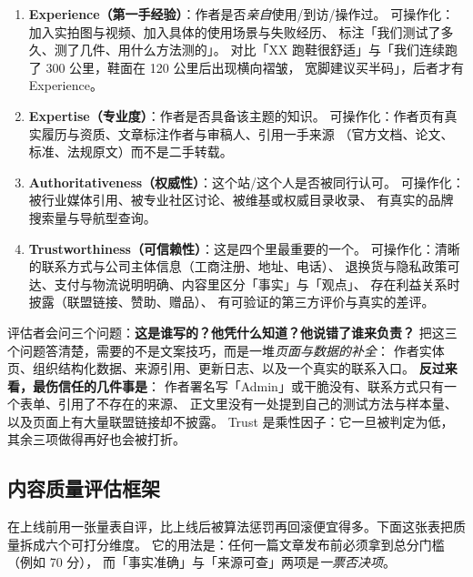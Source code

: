\begin{enumerate}
  \item \textbf{Experience（第一手经验）}：作者是否\emph{亲自}使用/到访/操作过。
        可操作化：加入实拍图与视频、加入具体的使用场景与失败经历、
        标注「我们测试了多久、测了几件、用什么方法测的」。
        对比「XX 跑鞋很舒适」与「我们连续跑了 300 公里，鞋面在 120 公里后出现横向褶皱，
        宽脚建议买半码」，后者才有 Experience。
  \item \textbf{Expertise（专业度）}：作者是否具备该主题的知识。
        可操作化：作者页有真实履历与资质、文章标注作者与审稿人、引用一手来源
        （官方文档、论文、标准、法规原文）而不是二手转载。
  \item \textbf{Authoritativeness（权威性）}：这个站/这个人是否被同行认可。
        可操作化：被行业媒体引用、被专业社区讨论、被维基或权威目录收录、
        有真实的品牌搜索量与导航型查询。
  \item \textbf{Trustworthiness（可信赖性）}：这是四个里最重要的一个。
        可操作化：清晰的联系方式与公司主体信息（工商注册、地址、电话）、
        退换货与隐私政策可达、支付与物流说明明确、内容里区分「事实」与「观点」、
        存在利益关系时披露（联盟链接、赞助、赠品）、
        有可验证的第三方评价与真实的差评。
\end{enumerate}

\begin{keypoint}
评估者会问三个问题：\textbf{这是谁写的？他凭什么知道？他说错了谁来负责？}
把这三个问题答清楚，需要的不是文案技巧，而是一堆\emph{页面与数据的补全}：
作者实体页、组织结构化数据、来源引用、更新日志、以及一个真实的联系入口。
\textbf{反过来看，最伤信任的几件事是}：
作者署名写「Admin」或干脆没有、联系方式只有一个表单、引用了不存在的来源、
正文里没有一处提到自己的测试方法与样本量、以及页面上有大量联盟链接却不披露。
Trust 是乘性因子：它一旦被判定为低，其余三项做得再好也会被打折。
\end{keypoint}

\subsection{内容质量评估框架}

在上线前用一张量表自评，比上线后被算法惩罚再回滚便宜得多。下面这张表把质量拆成六个可打分维度。
它的用法是：任何一篇文章发布前必须拿到总分门槛（例如 70 分），
而「事实准确」与「来源可查」两项是\emph{一票否决项}。

